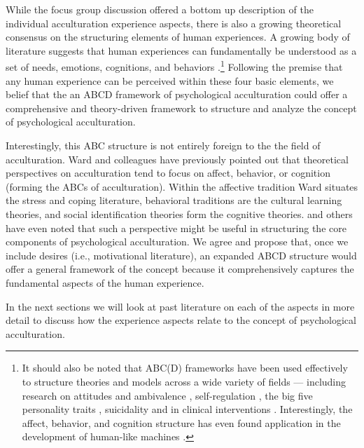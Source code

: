 \documentclass[man, 12pt, a4paper]{apa7}
\begin{document}
While the focus group discussion offered a bottom up description of the individual acculturation experience aspects, there is also a growing theoretical consensus on the structuring elements of human experiences. A growing body of literature suggests that human experiences can fundamentally be understood as a set of needs, emotions, cognitions, and behaviors \citep[sometimes referred to as the ABCs or ABCDs of psychology: affect, behavior, cognition, desire; e.g.,][]{Cottam2010, Hogg2005, Jhangiani2014}.\footnote{It should also be noted that ABC(D) frameworks have been used effectively to structure theories and models across a wide variety of fields --- including research on attitudes \citep{Breckler1984} and ambivalence \citep{VanHarreveld2015}, self-regulation \citep{Ben-Eliyahu2015}, the big five personality traits \citep{Wilt2016}, suicidality \citep{Harris2015} and in clinical interventions \citep{Eifert1989}. Interestingly, the affect, behavior, and cognition structure has even found application in the development of human-like machines \citep{Guo2020}.} Following the premise that any human experience can be perceived within these four basic elements, we belief that the an ABCD framework of psychological acculturation could offer a comprehensive and theory-driven framework to structure and analyze the concept of psychological acculturation.

Interestingly, this ABC structure is not entirely foreign to the the field of acculturation. Ward and colleagues \citep{Ward2001, Masgoret2006, Ward2019} have previously pointed out that theoretical perspectives on acculturation tend to focus on affect, behavior, or cognition (forming the ABCs of acculturation). Within the affective tradition Ward situates the stress and coping literature, behavioral traditions are the cultural learning theories, and social identification theories form the cognitive theories. \citet{Sam2006b} and others have even noted that such a perspective might be useful in structuring the core components of psychological acculturation. We agree and propose that, once we include desires (i.e., motivational literature), an expanded ABCD structure would offer a general framework of the concept because it comprehensively captures the fundamental aspects of the human experience.

In the next sections we will look at past literature on each of the aspects in more detail to discuss how the experience aspects relate to the concept of psychological acculturation. 
\end{document}
